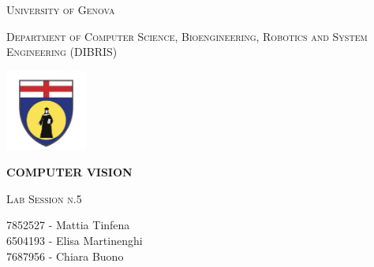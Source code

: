 \documentclass[12pt, a4paper]{report}
\begin{document}
\begin{titlepage}
    \centering
    {\scshape\large University of Genova \par}
    \vspace{0.3cm}
    {\scshape\large Department of Computer Science, Bioengineering, Robotics and System Engineering (DIBRIS) \par}
    \vspace{0.3cm}
    \includegraphics[width=0.2\textwidth]{mainmatter/Images/Unige-logo.jpeg}\\[0.3cm]
    
    {\LARGE\bfseries COMPUTER VISION \par}
    \vfill
    {\scshape\large Lab Session n.5 \par}
    \vfill
    
    \begin{minipage}[t]{0.45\textwidth}
        \begin{flushleft} \large
            7852527 - Mattia Tinfena\\
            6504193 - Elisa Martinenghi\\
            7687956 - Chiara Buono
        \end{flushleft}
    \end{minipage}
    
    \vfill

\end{titlepage}


\end{document}
